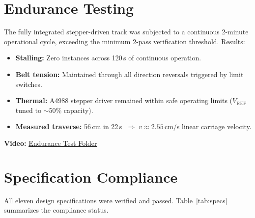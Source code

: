 \documentclass[12pt]{article}
\begin{document}
\section{Endurance Testing}

The fully integrated stepper-driven track was subjected to a continuous 2-minute operational cycle, exceeding the minimum 2-pass verification threshold. Results:

\begin{itemize}
    \item \textbf{Stalling:} Zero instances across 120\,s of continuous operation.
    \item \textbf{Belt tension:} Maintained through all direction reversals triggered by limit switches.
    \item \textbf{Thermal:} A4988 stepper driver remained within safe operating limits ($V_{\text{REF}}$ tuned to $\sim$50\% capacity).
    \item \textbf{Measured traverse:} 56\,cm in 22\,s $\;\Rightarrow\; v \approx 2.55$\,cm/s linear carriage velocity.
\end{itemize}

\textbf{Video:} \href{https://drive.google.com/drive/folders/1wNK_jYUvHXoMne_cIdYbAIURdvYpuG-J}{Endurance Test Folder}

\section{Specification Compliance}

All eleven design specifications were verified and passed. Table~\ref{tab:specs} summarizes the compliance status.
\end{document}
